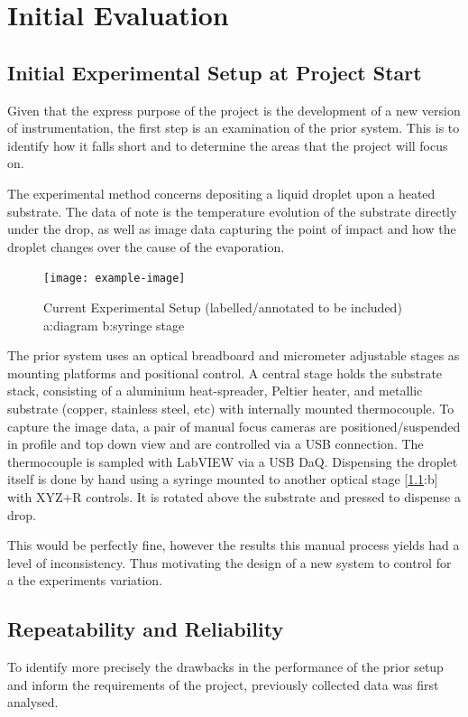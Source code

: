\chapter{Initial Evaluation}\label{C:init_eval}

\section{Initial Experimental Setup at Project Start}
Given that the express purpose of the project is the development of a new version of instrumentation, the first step is an examination of the prior system. This is to identify how it falls short and to determine the areas that the project will focus on.

The experimental method concerns depositing a liquid droplet upon a heated substrate. The data of note is the temperature evolution of the substrate directly under the drop, as well as image data capturing the point of impact and how the droplet changes over the cause of the evaporation.

\begin{figure}[h]
    \begin{center}
        \texttt{[image: example-image]}
        \caption{Current Experimental Setup (labelled/annotated to be included) a:diagram b:syringe stage}
        \label{fig:prior_exp}
    \end{center}
\end{figure}
The prior system uses an optical breadboard and micrometer adjustable stages as mounting platforms and positional control.
A central stage holds the substrate stack, consisting of a aluminium heat-spreader, Peltier heater, and metallic substrate (copper, stainless steel, etc) with internally mounted thermocouple.
To capture the image data, a pair of manual focus cameras are positioned/suspended in profile and top down view and are controlled via a USB connection. The thermocouple is sampled with LabVIEW via a USB DaQ.
Dispensing the droplet itself is done by hand using a syringe mounted to another optical stage [\ref{fig:prior_exp}:b] with XYZ+R controls. It is rotated above the substrate and pressed to dispense a drop.

This would be perfectly fine, however the results this manual process yields had a level of inconsistency. Thus motivating the design of a new system to control for a the experiments variation.

\newpage
\section{Repeatability and Reliability}
To identify more precisely the drawbacks in the performance of the prior setup and inform the requirements of the project, previously collected data was first analysed.

